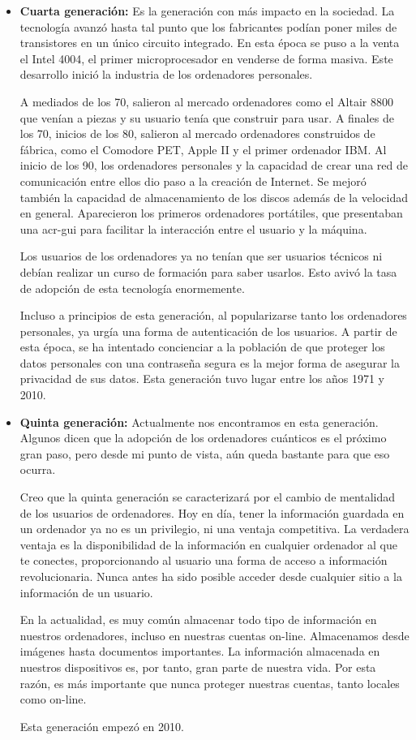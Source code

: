 \documentclass[titlepage, 12pt, a4paper]{article}
\begin{document}
\begin{itemize}
	\item{\textbf{Cuarta generación: }}Es la generación con más impacto en la sociedad. La tecnología avanzó hasta tal punto que los fabricantes podían poner miles de transistores en un único circuito integrado. En esta época se puso a la venta el Intel 4004, el primer microprocesador en venderse de forma masiva. Este desarrollo inició la industria de los ordenadores personales.\par A mediados de los 70, salieron al mercado ordenadores como el Altair 8800 que venían a piezas y su usuario tenía que construir para usar. A finales de los 70, inicios de los 80, salieron al mercado ordenadores construidos de fábrica, como el Comodore PET, Apple II y el primer ordenador IBM. Al inicio de los 90, los ordenadores personales y la capacidad de crear una red de comunicación entre ellos dio paso a la creación de Internet. Se mejoró también la capacidad de almacenamiento de los discos además de la velocidad en general. Aparecieron los primeros ordenadores portátiles, que presentaban una \gls{acr-gui} para facilitar la interacción entre el usuario y la máquina.\par Los usuarios de los ordenadores ya no tenían que ser usuarios técnicos ni debían realizar un curso de formación para saber usarlos. Esto avivó la tasa de adopción de esta tecnología enormemente.\par
		Incluso a principios de esta generación, al popularizarse tanto los ordenadores personales, ya urgía una forma de autenticación de los usuarios. A partir de esta época, se ha intentado concienciar a la población de que proteger los datos personales con una contraseña segura es la mejor forma de asegurar la privacidad de sus datos.
		Esta generación tuvo lugar entre los años 1971 y 2010. \par
	\item{\textbf{Quinta generación: }}Actualmente nos encontramos en esta generación. Algunos dicen que la adopción de los ordenadores cuánticos es el próximo gran paso, pero desde mi punto de vista, aún queda bastante para que eso ocurra.\par Creo que la quinta generación se caracterizará por el cambio de mentalidad de los usuarios de ordenadores. Hoy en día, tener la información guardada en un ordenador ya no es un privilegio, ni una ventaja competitiva. La verdadera ventaja es la disponibilidad de la información en cualquier ordenador al que te conectes, proporcionando al usuario una forma de acceso a información revolucionaria. Nunca antes ha sido posible acceder desde cualquier sitio a la información de un usuario. \par
		En la actualidad, es muy común almacenar todo tipo de información en nuestros ordenadores, incluso en nuestras cuentas on-line. Almacenamos desde imágenes hasta documentos importantes. La información almacenada en nuestros dispositivos es, por tanto, gran parte de nuestra vida. Por esta razón, es más importante que nunca proteger nuestras cuentas, tanto locales como on-line. \par
		Esta generación empezó en 2010.
\end{itemize} \par
\end{document}

